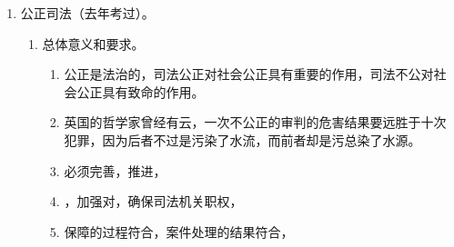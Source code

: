 \begin{enumerate}
\begin{enumerate}
\begin{enumerate}
                  \item 执法是行政机关、的主要方式。
                  \item {}。
                  \item 各级政府必须坚持、开展工作，
                  \item 创新，完善执法，严格执法，推进，
                  \item 建立的依法行政体制，
                  \item 加快建设的法治政府。
                \end{enumerate}
          \item 具体措施。
                \begin{enumerate}
                  \item 依法政府职能。
                  \item 健全机制。
                  \item 深化行政改革。
                  \item 坚持严格规范公正。
                  \item 强化对行政权力的。
                  \item 全面推进。
                \end{enumerate}
        \end{enumerate}
  \item 公正司法（去年考过）。
        \begin{enumerate}
          \item 总体意义和要求。
                \begin{enumerate}
                  \item 公正是法治的，司法公正对社会公正具有重要的作用，司法不公对社会公正具有致命的作用。
                  \item 英国的哲学家曾经有云，一次不公正的审判的危害结果要远胜于十次犯罪，因为后者不过是污染了水流，而前者却是污总染了水源。
                  \item 必须完善，推进，
                  \item {}，加强对，确保司法机关职权，
                  \item 保障的过程符合，案件处理的结果符合，

\end{enumerate}
\end{enumerate}
\end{enumerate}
